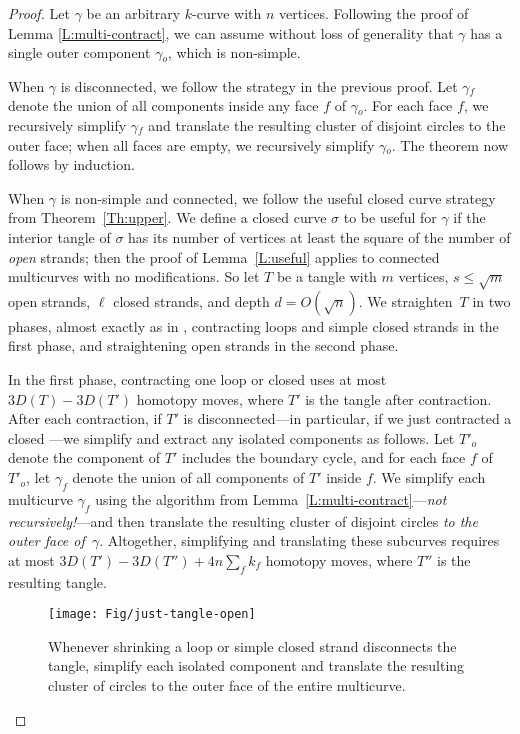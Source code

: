 \documentclass[11pt,twoside]{article}
\let\EDIT\relax
\numberwithin{figure}{section}
\begin{document}
\begin{proof}
Let $\gamma$ be an arbitrary $k$-curve with $n$ vertices.  Following the proof of Lemma \ref{L:multi-contract}, we can assume without loss of generality that $\gamma$ has a single outer component $\gamma\!_o$, which is non-simple.

When $\gamma$ is disconnected, we follow the strategy in the previous proof.  Let $\gamma\!_f$ denote the union of all components inside any face $f$ of $\gamma\!_o$.  For each face $f$, we recursively simplify $\gamma\!_f$ and translate the resulting cluster of disjoint circles to the outer face; when all faces are empty, we recursively simplify $\gamma\!_o$.  The theorem now follows by induction.

When $\gamma$ is non-simple and connected, we follow the useful closed curve strategy from Theorem~\ref{Th:upper}. We define a closed curve $\sigma$ to be useful for $\gamma$ if the interior tangle of $\sigma$ has its number of vertices at least the square of the number of \emph{open} strands; then the proof of Lemma~\ref{L:useful} applies to connected multicurves with no modifications.  So let $T$ be a tangle with $m$ vertices, $s \le \sqrt{m}$ open strands, $\ell$ closed strands, and depth $d = O(\sqrt{n})$.  We straighten~$T$ in two phases, almost exactly as in \EDIT{Section~\ref{SS:tangles}}, contracting loops and simple closed strands in the first phase, and straightening open strands in the second phase.

In the first phase, contracting one loop or \EDIT{simple} closed \EDIT{strand} uses at most $3D(T) - 3D(T')$ homotopy moves, where $T'$ is the tangle after contraction.  After each contraction, if $T'$ is disconnected—in particular, if we just contracted a \EDIT{simple} closed \EDIT{strand}—we simplify and extract any isolated components as follows.  Let $T'_o$ denote the component of $T'$ \EDIT{that} includes the boundary cycle, and for each face $f$ of $T'_o$, let $\gamma_f$ denote the union of all components of $T'$ inside $f$.  We simplify each multicurve $\gamma_f$ using the algorithm from Lemma~\ref{L:multi-contract}—\emph{not recursively!}—and then translate the resulting cluster of disjoint circles \emph{to the outer face of~$\gamma$}.  \EDIT{See Figure \ref{F:tighten-open}.}  Altogether, simplifying and translating these subcurves requires at most
\(
	3D(T') - 3D(T'') + 4n \sum_f k_f
\)
homotopy moves, where $T''$ is the resulting tangle.

\begin{figure}[ht]
\centering
\texttt{[image: Fig/just-tangle-open]}
\caption{Whenever shrinking a loop or simple closed strand disconnects the tangle, simplify each isolated component and translate the resulting cluster of circles to the outer face of the entire multicurve.}
\label{F:tighten-open}
\end{figure}


\end{proof}
\end{document}
